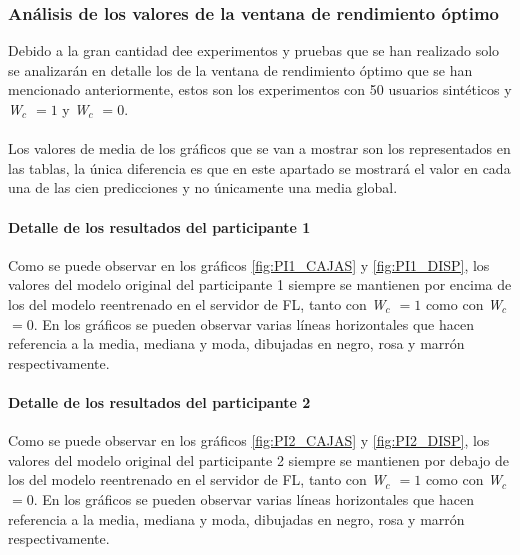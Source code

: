 \subsubsection{Análisis de los valores de la ventana de rendimiento óptimo}
Debido a la gran cantidad dee experimentos y pruebas que se han realizado solo se analizarán en detalle los de la ventana de rendimiento óptimo que se han mencionado anteriormente, estos son los experimentos con 50 usuarios sintéticos y \textit{W$_c$ $=1$} y \textit{W$_c$ $=0$}.
\\ \\
Los valores de media de los gráficos que se van a mostrar son los representados en las tablas, la única diferencia es que en este apartado se mostrará el valor en cada una de las cien predicciones y no únicamente una media global.

\paragraph{Detalle de los resultados del participante 1}
Como se puede observar en los gráficos \ref{fig:PI1_CAJAS} y \ref{fig:PI1_DISP}, los valores del modelo original del participante 1 siempre se mantienen por encima de los del modelo reentrenado en el servidor de FL, tanto con \textit{W$_c$ $=1$} como con \textit{W$_c$ $=0$}. En los gráficos se pueden observar varias líneas horizontales que hacen referencia a la media, mediana y moda, dibujadas en negro, rosa y marrón respectivamente.

\paragraph{Detalle de los resultados del participante 2}
Como se puede observar en los gráficos \ref{fig:PI2_CAJAS} y \ref{fig:PI2_DISP}, los valores del modelo original del participante 2 siempre se mantienen por debajo de los del modelo reentrenado en el servidor de FL, tanto con \textit{W$_c$ $=1$} como con \textit{W$_c$ $=0$}. En los gráficos se pueden observar varias líneas horizontales que hacen referencia a la media, mediana y moda, dibujadas en negro, rosa y marrón respectivamente.

